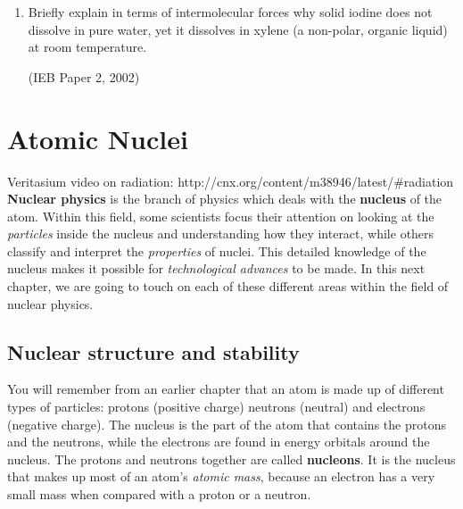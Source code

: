 \begin{eocexercises}{}
\begin{enumerate}
\item{Briefly explain in terms of intermolecular forces why solid iodine does not dissolve in pure water, yet it dissolves in xylene (a non-polar, organic liquid) at room temperature.}

(IEB Paper 2, 2002)

\end{enumerate}

\practiceinfo
\end{eocexercises}







\chapter{Atomic Nuclei}
\label{chap:an}
Veritasium video on radiation: http://cnx.org/content/m38946/latest/#radiation
\textbf{Nuclear physics} is the branch of physics which deals with the \textbf{nucleus} of the atom. Within this field, some scientists focus their attention on looking at the \textit{particles} inside the nucleus and understanding how they interact, while others classify and interpret the \textit{properties} of nuclei. This detailed knowledge of the nucleus makes it possible for \textit{technological advances} to be made. In this next chapter, we are going to touch on each of these different areas within the field of nuclear physics.



\section{Nuclear structure and stability}
\label{sec:an:ns}

You will remember from an earlier chapter that an atom is made up of different types of particles: protons (positive charge) neutrons (neutral) and electrons (negative charge). The nucleus is the part of the atom that contains the protons and the neutrons, while the electrons are found in energy orbitals around the nucleus. The protons and neutrons together are called \textbf{nucleons}. It is the nucleus that makes up most of an atom's \textit{atomic mass}, because an electron has a very small mass when compared with a proton or a neutron.\\

